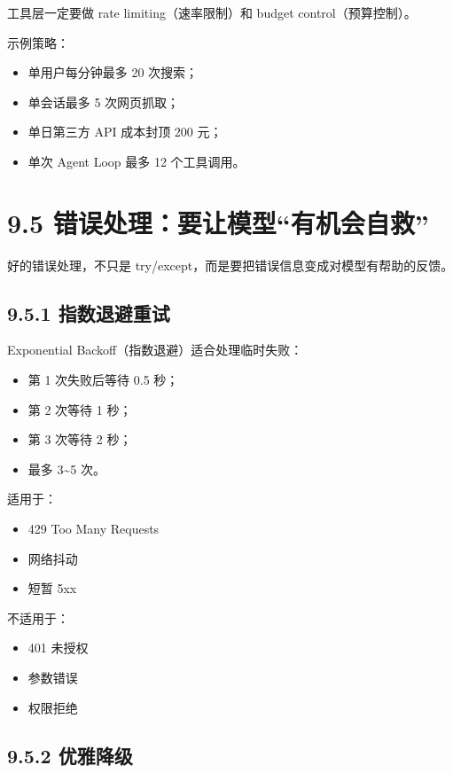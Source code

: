 工具层一定要做 rate limiting（速率限制）和 budget control（预算控制）。


示例策略：


\begin{itemize}[leftmargin=2em]
\item 单用户每分钟最多 20 次搜索；
\item 单会话最多 5 次网页抓取；
\item 单日第三方 API 成本封顶 200 元；
\item 单次 Agent Loop 最多 12 个工具调用。
\end{itemize}

\section{9.5 错误处理：要让模型``有机会自救''}

好的错误处理，不只是 try/except，而是要把错误信息变成对模型有帮助的反馈。


\subsection{9.5.1 指数退避重试}

Exponential Backoff（指数退避）适合处理临时失败：


\begin{itemize}[leftmargin=2em]
\item 第 1 次失败后等待 0.5 秒；
\item 第 2 次等待 1 秒；
\item 第 3 次等待 2 秒；
\item 最多 3\textasciitilde{}5 次。
\end{itemize}

适用于：


\begin{itemize}[leftmargin=2em]
\item 429 Too Many Requests
\item 网络抖动
\item 短暂 5xx
\end{itemize}

不适用于：


\begin{itemize}[leftmargin=2em]
\item 401 未授权
\item 参数错误
\item 权限拒绝
\end{itemize}

\subsection{9.5.2 优雅降级}

